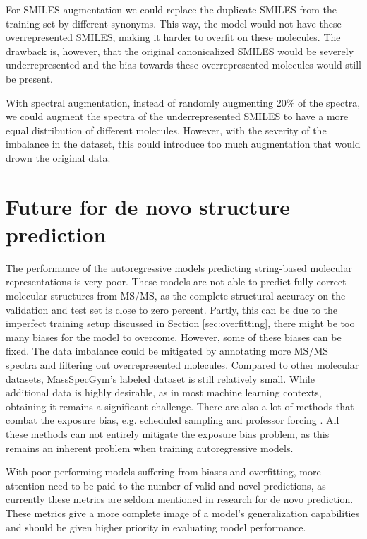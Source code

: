 \begin{description}
    For SMILES augmentation we could replace the duplicate SMILES from the training set by different synonyms.
    This way, the model would not have these overrepresented SMILES, making it harder to overfit on these molecules.
    The drawback is, however, that the original canonicalized SMILES would be severely underrepresented and the bias towards these overrepresented molecules would still be present.

    With spectral augmentation, instead of randomly augmenting 20\% of the spectra, we could augment the spectra of the underrepresented SMILES to have a more equal distribution of different molecules.
    However, with the severity of the imbalance in the dataset, this could introduce too much augmentation that would drown the original data.

\end{description}


\section{Future for de novo structure prediction}

The performance of the autoregressive models predicting string-based molecular representations is very poor.
These models are not able to predict fully correct molecular structures from \ac{MS/MS}, as the complete structural accuracy on the validation and test set is close to zero percent.
Partly, this can be due to the imperfect training setup discussed in Section \ref{sec:overfitting}, there might be too many biases for the model to overcome.
However, some of these biases can be fixed.
The data imbalance could be mitigated by annotating more \ac{MS/MS} spectra and filtering out overrepresented molecules.
Compared to other molecular datasets, MassSpecGym's labeled dataset is still relatively small.
While additional data is highly desirable, as in most machine learning contexts, obtaining it remains a significant challenge.
There are also a lot of methods that combat the exposure bias, e.g. scheduled sampling \cite{bengio2015scheduled} and professor forcing \cite{lamb2016professor}.
All these methods can not entirely mitigate the exposure bias problem, as this remains an inherent problem when training autoregressive models.

With poor performing models suffering from biases and overfitting, more attention need to be paid to the number of valid and novel predictions, as currently these metrics are seldom mentioned in research for de novo prediction. 
These metrics give a more complete image of a model's generalization capabilities and should be given higher priority in evaluating model performance.

